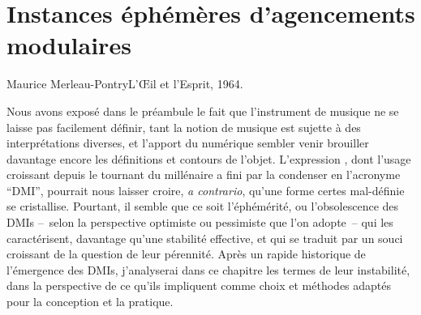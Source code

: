 %
\chapter{Instances éphémères d'agencements modulaires}
\label{ch:ephemeral}



{Maurice Merleau-Pontry}{L'Œil et l'Esprit, 1964.\\\cite{merleau-ponty_loeil_1964}} %


\vspace*{\fill}

\noindent Nous avons exposé dans le préambule le fait que l'instrument de musique ne se laisse pas facilement définir, tant la notion de musique est sujette à des interprétations diverses, et l'apport du numérique sembler venir brouiller davantage encore les définitions et contours de l'objet. L'expression , dont l'usage croissant depuis le tournant du millénaire a fini par la condenser en l'acronyme ``\gls{DMI}'', pourrait nous laisser croire, \textit{a contrario}, qu'une forme certes mal-définie se cristallise. Pourtant, il semble que ce soit l'éphémérité, ou l'obsolescence des \glspl{DMI} --~selon la perspective optimiste ou pessimiste que l'on adopte~-- qui les caractérisent, davantage qu'une stabilité effective, et qui se traduit par un souci croissant de la question de leur pérennité. Après un rapide historique de l'émergence des \glspl{DMI}, j'analyserai dans ce chapitre les termes de leur instabilité, dans la perspective de ce qu'ils impliquent comme choix et méthodes adaptés pour la conception et la pratique.

